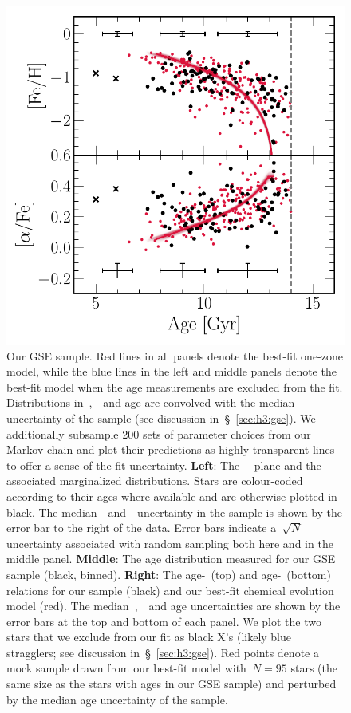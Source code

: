 \documentclass[ms.tex]{subfiles}
\begin{document}
\begin{figure}
\includegraphics[scale = 0.53]{gsefit_amr.pdf}
\caption{
Our GSE sample.
Red lines in all panels denote the best-fit one-zone model, while the
blue lines in the left and middle panels denote the best-fit model when the
age measurements are excluded from the fit.
Distributions in~\feh,~\afe~and age are convolved with the median uncertainty
of the sample (see discussion in~\S~\ref{sec:h3:gse}).
We additionally subsample 200 sets of parameter choices from our Markov chain
and plot their predictions as highly transparent lines to offer a sense of the
fit uncertainty.
\textbf{Left}: The~\afe-\feh~plane and the associated marginalized
distributions.
Stars are colour-coded according to their ages where available and are
otherwise plotted in black.
The median~\feh~and~\afe~uncertainty in the sample is shown by the error bar
to the right of the data.
Error bars indicate a~$\sqrt{N}$ uncertainty associated with random
sampling both here and in the middle panel.
\textbf{Middle}: The age distribution measured for our GSE sample (black,
binned).
\textbf{Right}: The age-\feh~(top) and age-\afe~(bottom) relations for our
sample (black) and our best-fit chemical evolution model (red).
The median~\feh,~\afe~and age uncertainties are shown by the error bars at the
top and bottom of each panel.
We plot the two stars that we exclude from our fit as black X's (likely
blue stragglers; see discussion in~\S~\ref{sec:h3:gse}).
Red points denote a mock sample drawn from our best-fit model with~$N = 95$
stars (the same size as the stars with ages in our GSE sample) and perturbed by
the median age uncertainty of the sample.
}
\label{fig:gse}
\end{figure}
\end{document}
